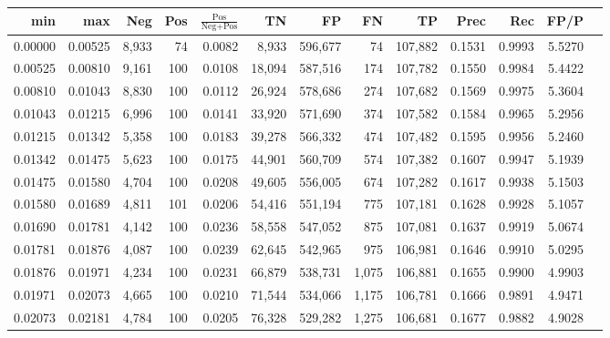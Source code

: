 \begin{tabular}{rrrrrrrrrrrrr}
\toprule
    min &     max &   Neg & Pos & $\frac{\text{Pos}}{\text{Neg}+\text{Pos}}$ &      TN &      FP &      FN &      TP &   Prec &    Rec &   FP/P \\
\midrule
0.00000 & 0.00525 & 8,933 &  74 &                                     0.0082 &   8,933 & 596,677 &      74 & 107,882 & 0.1531 & 0.9993 & 5.5270 \\
0.00525 & 0.00810 & 9,161 & 100 &                                     0.0108 &  18,094 & 587,516 &     174 & 107,782 & 0.1550 & 0.9984 & 5.4422 \\
0.00810 & 0.01043 & 8,830 & 100 &                                     0.0112 &  26,924 & 578,686 &     274 & 107,682 & 0.1569 & 0.9975 & 5.3604 \\
0.01043 & 0.01215 & 6,996 & 100 &                                     0.0141 &  33,920 & 571,690 &     374 & 107,582 & 0.1584 & 0.9965 & 5.2956 \\
0.01215 & 0.01342 & 5,358 & 100 &                                     0.0183 &  39,278 & 566,332 &     474 & 107,482 & 0.1595 & 0.9956 & 5.2460 \\
0.01342 & 0.01475 & 5,623 & 100 &                                     0.0175 &  44,901 & 560,709 &     574 & 107,382 & 0.1607 & 0.9947 & 5.1939 \\
0.01475 & 0.01580 & 4,704 & 100 &                                     0.0208 &  49,605 & 556,005 &     674 & 107,282 & 0.1617 & 0.9938 & 5.1503 \\
0.01580 & 0.01689 & 4,811 & 101 &                                     0.0206 &  54,416 & 551,194 &     775 & 107,181 & 0.1628 & 0.9928 & 5.1057 \\
0.01690 & 0.01781 & 4,142 & 100 &                                     0.0236 &  58,558 & 547,052 &     875 & 107,081 & 0.1637 & 0.9919 & 5.0674 \\
0.01781 & 0.01876 & 4,087 & 100 &                                     0.0239 &  62,645 & 542,965 &     975 & 106,981 & 0.1646 & 0.9910 & 5.0295 \\
0.01876 & 0.01971 & 4,234 & 100 &                                     0.0231 &  66,879 & 538,731 &   1,075 & 106,881 & 0.1655 & 0.9900 & 4.9903 \\
0.01971 & 0.02073 & 4,665 & 100 &                                     0.0210 &  71,544 & 534,066 &   1,175 & 106,781 & 0.1666 & 0.9891 & 4.9471 \\
0.02073 & 0.02181 & 4,784 & 100 &                                     0.0205 &  76,328 & 529,282 &   1,275 & 106,681 & 0.1677 & 0.9882 & 4.9028 \\

\end{tabular}
